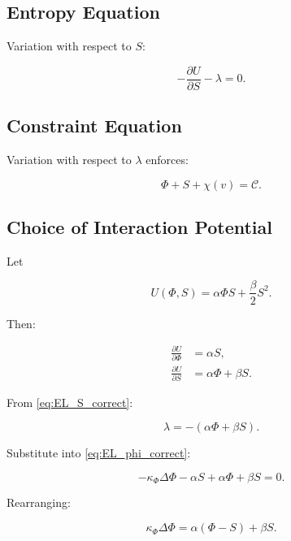 \documentclass[12pt,a4paper]{article}
\theoremstyle{definition}
\begin{document}
\subsection{Entropy Equation}

Variation with respect to $S$:

\begin{equation}
  - \frac{\partial U}{\partial S}
  - \lambda
  = 0.
  \label{eq:EL_S_correct}
\end{equation}

\subsection{Constraint Equation}

Variation with respect to $\lambda$ enforces:

\begin{equation}
  \Phi + S + \chi(v) = \mathcal{C}.
  \label{eq:constraint_RSVP}
\end{equation}

\subsection{Choice of Interaction Potential}

Let

\begin{equation}
  U(\Phi,S)
  =
  \alpha \Phi S
  + \frac{\beta}{2} S^2.
\end{equation}

Then:

\begin{align}
  \frac{\partial U}{\partial \Phi} &= \alpha S, \\
  \frac{\partial U}{\partial S} &= \alpha \Phi + \beta S.
\end{align}

From \eqref{eq:EL_S_correct}:

\begin{equation}
  \lambda = -(\alpha \Phi + \beta S).
\end{equation}

Substitute into \eqref{eq:EL_phi_correct}:

\begin{equation}
  -\kappa_\Phi \Delta \Phi
  - \alpha S
  + \alpha \Phi + \beta S
  = 0.
\end{equation}

Rearranging:

\begin{equation}
  \kappa_\Phi \Delta \Phi
  =
  \alpha(\Phi - S) + \beta S.
\end{equation}
\end{document}
